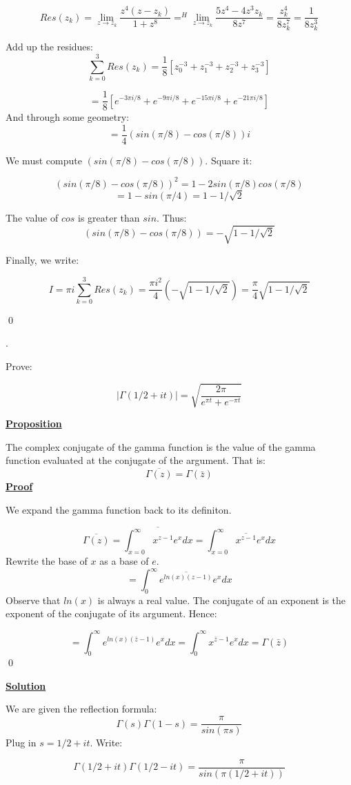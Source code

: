 \documentclass{article}
\newcommand{\new}[1]{
    \vspace{2mm}
    \noindent
    \textbf{
    \underline{#1}}
}
\newcounter{problemcnt}
\newcommand{\Problem}{{
    \vspace{5mm}
    \stepcounter{problemcnt}
    \noindent
    \arabic{problemcnt}. 
}
}
\newcommand{\Proof}{{
    \vspace{2mm}
    \noindent
    \textbf{
    \underline{Proof}}
}
}
\begin{document}
\[
    Res(z_k) = 
    \lim_{z\rightarrow z_k}
    \frac{z^4(z-z_k)}{1+z^8}
    =^H
\lim_{z\rightarrow z_k}
    \frac{5z^4-4z^3z_k}{8z^7}
    = \frac{z_k^4}{8z_k^7}
    = \frac{1}{8z_k^3}
\]

Add up the residues:
\[
    \sum_{k = 0}^{3}Res(z_k)
     =
     \frac{1}{8}
     [z_0^{-3}+z_1^{-3}+z_2^{-3}+z_3^{-3}]
\]

\[
    = \frac{1}{8}
    [e^{-3\pi i/8}+ e^{-9\pi i/8}+ e^{-15\pi i/8}+ e^{-21\pi i/8}]
\]
And through some geometry:
\[
    = \frac{1}{4}(sin(\pi/8)-cos(\pi/8))i
\]

We must compute $(sin(\pi/8)-cos(\pi/8))$. 
Square it:

\[
    (sin(\pi/8)-cos(\pi/8))^2 = 
    1-2sin(\pi/8)cos(\pi/8)
\]
\[
    = 1- sin(\pi/4) = 1- 1/\sqrt{2}
\]

The value of $cos$ is greater than $sin$. Thus:
\[
    (sin(\pi/8)-cos(\pi/8)) = -\sqrt{1- 1/\sqrt{2}}
\]

Finally, we write:

\[
    I = \pi i \sum_{k = 0}^{3}Res(z_k)
    =\frac{ \pi i^2}{4} (-\sqrt{1- 1/\sqrt{2}})
    = \frac{\pi}{4} \sqrt{1- 1/\sqrt{2}}
\]

\qed

\newpage

\Problem
Prove:

\[
    |\Gamma(1/2+it)| = \sqrt{\frac{2\pi}
    {e^{\pi t}+e^{-\pi t}}
    }
\]
\new{Proposition}
The complex conjugate of the gamma function 
is the value of the gamma function evaluated 
at the conjugate of the argument. That is:
\[
   \overline{\Gamma(z)} = \Gamma(\bar{z})  
\]
\Proof
We expand the gamma function back to its definiton. 

\[
    \overline{
        \Gamma(z)
    }
    = \overline{
        \int_{x = 0}^\infty
        x^{z-1}e^xdx
    }
    = \int_{x = 0}^\infty
    \overline{x^{z-1}}e^x dx
\]
Rewrite the base of $x$ as 
a base of $e$. 
\[
   = \int_0^\infty 
   \overline{
    e^{ln(x)(z-1)}
   } 
   e^x dx
\]
Observe that $ln(x)$ is always a 
real value. The conjugate of an exponent
is the exponent of the conjugate of 
its argument. Hence:

\[
    = 
    \int_0^\infty
    e^{ln(x)(\bar{z}-1)}e^x dx
    = 
    \int_0^\infty
    x^{\bar{z}-1}e^x dx
    =
    \Gamma(\bar{z})
\]
\qed

\new{Solution}
We are given the reflection formula:
\[
    \Gamma(s)\Gamma(1-s)
    =\frac{\pi}{sin(\pi s)}
\]
Plug in $s = 1/2 + it$. Write:

\[
    \Gamma(1/2+it)\Gamma(1/2-it)
    =\frac{\pi}{sin(\pi (1/2 + it))}
\]
\end{document}
